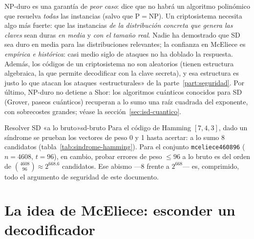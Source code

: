\documentclass[11pt,a4paper,oneside]{report}
\begin{document}
\begin{rigor}
NP-duro es una garantía de \emph{peor caso}: dice que no habrá un algoritmo
polinómico que resuelva \emph{todas} las instancias (salvo que P$=$NP). Un
criptosistema necesita algo más fuerte: que las instancias \emph{de la
distribución concreta que genera las claves} sean duras \emph{en media} y
\emph{con el tamaño real}. Nadie ha demostrado que SD sea duro en media
para las distribuciones relevantes; la confianza en McEliece es
\emph{empírica e histórica}: casi medio siglo de ataques no ha doblado la
respuesta. Además, los códigos de un criptosistema no son aleatorios (tienen
estructura algebraica, la que permite decodificar con la clave secreta), y
esa estructura es justo lo que atacan los ataques «estructurales» de la
parte~\ref{part:seguridad}. Por último, NP-duro no detiene a Shor: los
algoritmos cuánticos conocidos para SD (Grover, paseos cuánticos) recuperan
a lo sumo una raíz cuadrada del exponente, con sobrecostes grandes; véase
la sección~\ref{sec:isd-cuantico}.
\end{rigor}

\begin{ejemplo}{Resolver SD «a lo bruto»}{sd-bruto}
Para el código de Hamming $[7,4,3]$, dado un síndrome se prueban los
vectores de peso 0 y 1 hasta acertar: a lo sumo 8 candidatos
(tabla~\ref{tab:sindrome-hamming}). Para el conjunto
\texttt{mceliece460896} ($n=4608$, $t=96$), en cambio, probar errores de
peso $\le 96$ a lo bruto es del orden de $\binom{4608}{96}\approx
2^{668.6}$ candidatos. Ese abismo ---8 frente a $2^{668}$--- es,
comprimido, todo el argumento de seguridad de este
documento.
\end{ejemplo}

\section{La idea de McEliece: esconder un decodificador}
\end{document}
